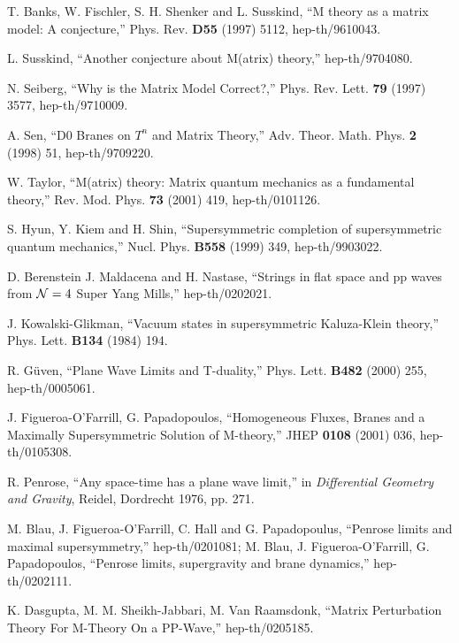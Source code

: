 \documentclass[a4paper,12pt]{article}
\begin{document}
\begin{thebibliography}{99}

 T. Banks, W. Fischler, S. H. Shenker and
L. Susskind, ``M theory as a matrix model: A conjecture,''
Phys. Rev. {\bf D55} (1997) 5112, hep-th/9610043.

 L. Susskind, ``Another conjecture about
M(atrix) theory,'' hep-th/9704080.

 N. Seiberg, ``Why is the Matrix Model Correct?,''
Phys. Rev. Lett. {\bf 79} (1997) 3577, hep-th/9710009.

 A. Sen, ``D0 Branes on $T^n$ and Matrix Theory,''
Adv. Theor. Math. Phys. {\bf 2} (1998) 51, hep-th/9709220.

 W. Taylor, ``M(atrix) theory: Matrix quantum
mechanics as a fundamental theory,'' Rev. Mod. Phys. {\bf 73}
(2001) 419, hep-th/0101126.

 S. Hyun, Y. Kiem and H. Shin, ``Supersymmetric
completion of supersymmetric quantum mechanics,'' Nucl. Phys. {\bf
B558} (1999) 349, hep-th/9903022.

 D. Berenstein J. Maldacena and H. Nastase,
``Strings in flat space and pp waves from ${\cal N} = 4$ Super
Yang Mills,'' hep-th/0202021.

 J. Kowalski-Glikman, ``Vacuum states in
supersymmetric Kaluza-Klein theory,'' Phys. Lett. {\bf B134}
(1984) 194.

 R. G\"{u}ven, ``Plane Wave Limits and
T-duality,'' Phys. Lett. {\bf B482} (2000) 255, hep-th/0005061.

J. Figueroa-O'Farrill, G. Papadopoulos, ``Homogeneous Fluxes,
Branes and a Maximally Supersymmetric Solution of M-theory,'' JHEP
{\bf 0108} (2001)  036, hep-th/0105308.

 R. Penrose, ``Any space-time has a plane wave
limit,'' in {\it Differential Geometry and Gravity}, Reidel,
Dordrecht 1976, pp. 271.

 M. Blau, J. Figueroa-O'Farrill, C. Hall and G.
Papadopoulus, ``Penrose limits and maximal supersymmetry,''
hep-th/0201081; M. Blau, J. Figueroa-O'Farrill, G. Papadopoulos,
``Penrose limits, supergravity and brane dynamics,''
hep-th/0202111.

 K. Dasgupta, M. M. Sheikh-Jabbari, M. Van
Raamsdonk, ``Matrix Perturbation Theory For M-Theory On a
PP-Wave,'' hep-th/0205185.


\end{thebibliography}
\end{document}
